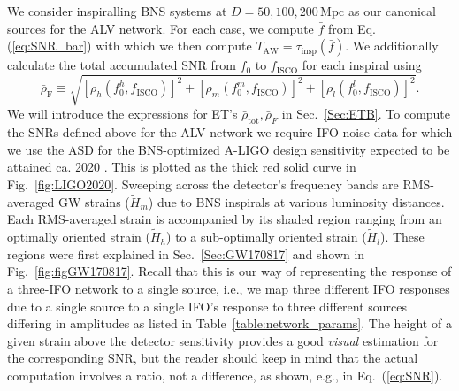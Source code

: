 \documentclass[amsmath,amssymb,aps,floats,amsfonts,notitlepage,superscriptaddress,eqsecnum,nofootinbib,10pt]{revtex4-1}
\newcommand{\be}{\begin{equation}}
\newcommand{\ee}{\end{equation}}
\begin{document}
%
 We consider inspiralling BNS systems at $D=50,100,200\,$Mpc as our canonical sources for the ALV network.  
 For each case, we compute $\bar{f}$ from Eq.(\ref{eq:SNR_bar}) with which we then compute $T_\text{AW}=\tau_\text{insp}(\bar{f})$.
%
We additionally calculate 
the total accumulated SNR from $f_0$ to $f_\text{ISCO}$ for each inspiral using%
\be
\bar{\rho}_\text{F}\equiv\sqrt{\left[{\rho}_h(f_0^h,{f}_\text{ISCO})\right]^2+\left[{\rho}_m(f_0^m,{f}_\text{ISCO})\right]^2+\left[{\rho}_l(f_0^l,{f}_\text{ISCO})\right]^2} \label{eq:SNR_bar_FINAL} .
\ee
%
%
We will introduce the expressions for ET's $\bar\rho_\text{tot},\bar\rho_F$ in Sec.~\ref{Sec:ETB}.
To compute the SNRs defined above for the ALV network we require IFO noise data for which
we use the ASD for the BNS-optimized A-LIGO design sensitivity expected to be attained ca. 2020 \cite{LIGO2020}. 
This is plotted as the thick red solid curve in Fig.~\ref{fig:LIGO2020}.
Sweeping across the detector's frequency bands are RMS-averaged GW strains ($\tilde{H}_m$) due to BNS inspirals at various luminosity distances.
Each RMS-averaged strain is accompanied by its shaded region ranging from an optimally oriented strain ($\tilde{H}_h$) to a sub-optimally oriented strain ($\tilde{H}_l$). These regions were first explained in Sec.~\ref{Sec:GW170817} and shown in Fig.~\ref{fig:figGW170817}.
Recall that this is our way of representing the response of a three-IFO network to a single source, i.e., we map three different IFO responses due to a single source to a single IFO's response to three different sources differing in amplitudes as listed in Table~\ref{table:network_params}.
The height of a given strain above the detector sensitivity provides a good \emph{visual} estimation for the corresponding SNR,
but the reader should keep in mind that the actual computation involves a ratio, not a difference, as shown, e.g., in Eq.~(\ref{eq:SNR}).
%
%
%
\end{document}
